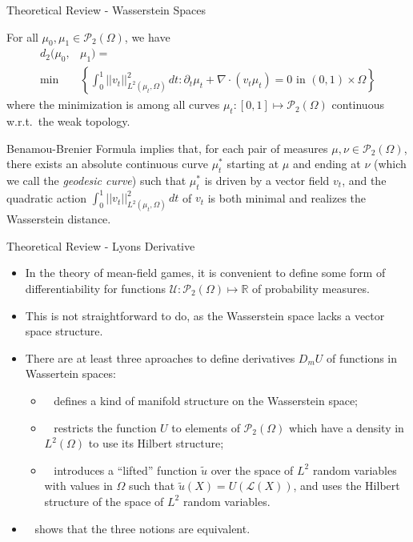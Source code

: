 \documentclass{beamer}
\newcommand{\RR}[0]{\mathbb{R}}
\begin{document}
{\begin{frame}{Theoretical Review - Wasserstein Spaces}
    \begin{theorem}
    For all  $\mu_0, \mu_1 \in \mathcal{P}_2(\Omega)$, we have
    \begin{align*}
        d_2(\mu_0, & \mu_1) =  \\  \min &\left\{ \int_0^1 ||v_t||^2_{L^2(\mu_t, \Omega)} \, dt : \partial_t \mu_t + \nabla \cdot (v_t \mu_t) = 0 \text{ in } (0,1) \times \Omega \right\}
    \end{align*} 
    where the minimization is among all curves $\mu_t : [0,1] \mapsto \mathcal{P}_2(\Omega)$
    continuous w.r.t.~the weak topology.
\end{theorem}

Benamou-Brenier Formula implies that,
for each pair of measures $\mu, \nu \in \mathcal{P}_2(\Omega)$,
there exists an absolute continuous curve $\mu^*_t$ starting at $\mu$ and ending at $\nu$ 
(which we call the \textit{geodesic curve})
such that $\mu^*_t$ is driven by a vector field $v_t$, and the quadratic action
$\int_0^1 ||v_t||^2_{L^2(\mu_t, \Omega)} \, dt$ of $v_t$
is both minimal and realizes the Wasserstein distance.
\end{frame}
\begin{frame}{Theoretical Review - Lyons Derivative}
\begin{itemize}
    \item In the theory of mean-field games, it is convenient to define some
form of differentiability for functions
 $\mathcal{U} : \mathcal{P}_2(\Omega) \mapsto \RR$ of probability measures.
 \item This is not straightforward to do, as the Wasserstein space lacks a vector space
 structure.
\item There are at least three aproaches to define derivatives $D_m U$ of functions in
Wassertein spaces: 
\begin{itemize}
    \item ~\cite{ambrosio2005gradient} defines a kind of manifold structure
on the Wasserstein space;
\item ~\cite{cardaliaguet2019master} restricts the 
function $U$ to elements of $\mathcal{P}_2(\Omega)$ which have a density in 
$L^2(\Omega)$ to use its Hilbert structure; 
\item ~\cite{cardaliaguet2010notes} introduces a ``lifted'' function $\tilde u$ over the space of $L^2$ random variables with values
in $\Omega$ such that $\tilde u(X) = U(\mathcal{L}(X))$, and uses the Hilbert structure
of the space of $L^2$ random variables.
\end{itemize}
\item ~\cite[Ch 5]{carmona2018probabilistic} shows that the three notions are equivalent.
\end{itemize}


\end{frame}}
\end{document}
